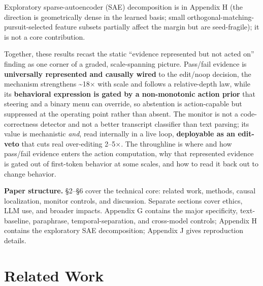 \documentclass[
  11pt,
  a4paper]{article}
\begin{document}
Exploratory sparse-autoencoder (SAE) decomposition is in Appendix H (the
direction is geometrically dense in the learned basis; small
orthogonal-matching-pursuit-selected feature subsets partially affect
the margin but are seed-fragile); it is not a core contribution.

Together, these results recast the static ``evidence represented but not
acted on'' finding as one corner of a graded, scale-spanning picture.
Pass/fail evidence is \textbf{universally represented and causally
wired} to the edit/noop decision, the mechanism strengthens
\textasciitilde18\ensuremath{\times} with scale and follows a relative-depth law, while
its \textbf{behavioral expression is gated by a non-monotonic action
prior} that steering and a binary menu can override, so abstention is
action-capable but suppressed at the operating point rather than absent.
The monitor is not a code-correctness detector and not a better
transcript classifier than text parsing; its value is mechanistic
\emph{and}, read internally in a live loop, \textbf{deployable as an
edit-veto} that cuts real over-editing 2--5\ensuremath{\times}. The throughline is where
and how pass/fail evidence enters the action computation, why that
represented evidence is gated out of first-token behavior at some
scales, and how to read it back out to change behavior.

\textbf{Paper structure.} \S{}2--\S{}6 cover the technical core: related work,
methods, causal localization, monitor controls, and discussion. Separate
sections cover ethics, LLM use, and broader impacts. Appendix G contains
the major specificity, text-baseline, paraphrase, temporal-separation,
and cross-model controls; Appendix H contains the exploratory SAE
decomposition; Appendix J gives reproduction details.

\section{Related Work}\label{related-work}
\end{document}
